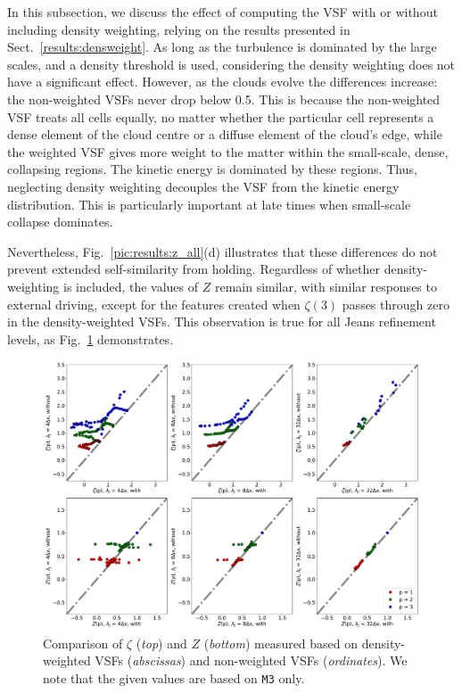In this subsection, we discuss the effect of computing the VSF with or without including density weighting, relying on the results presented in Sect.~\ref{results:densweight}.
As long as the turbulence is dominated by the large scales, and a density threshold is used, considering the density weighting does not have a significant effect.
However, as the clouds evolve the differences increase:
the non-weighted VSFs never drop below 0.5.
This is because the non-weighted VSF treats all cells equally, no matter whether the particular cell represents a dense element of the cloud centre or a diffuse element of the cloud's edge, while the weighted VSF gives more weight to the matter within the small-scale, dense, collapsing regions.
The kinetic energy is dominated by these regions.
Thus, neglecting density weighting decouples the VSF from the kinetic energy distribution. 
This is particularly important at late times when small-scale collapse dominates.

Nevertheless, Fig.~\ref{pic:results:z_all}(d) illustrates that these differences do not prevent extended self-similarity from holding. 
Regardless of whether density-weighting is included, the values of $Z$ remain similar, with similar responses to external driving, except for the features created when $\zeta(3)$ passes through zero in the density-weighted VSFs.
This observation is true for all Jeans refinement levels, as Fig.~\ref{pic:results:comp_weighting} demonstrates.


\begin{figure}
	\centering
    \includegraphics[width=\textwidth]{comp_weighting.pdf}
    \caption{ Comparison of $\zeta$ (\textit{top}) and $Z$ (\textit{bottom}) measured based on density-weighted VSFs (\textit{abscissas}) and non-weighted VSFs (\textit{ordinates}). We note that the given values are based on \texttt{M3} only.}
    \label{pic:results:comp_weighting}
\end{figure}

